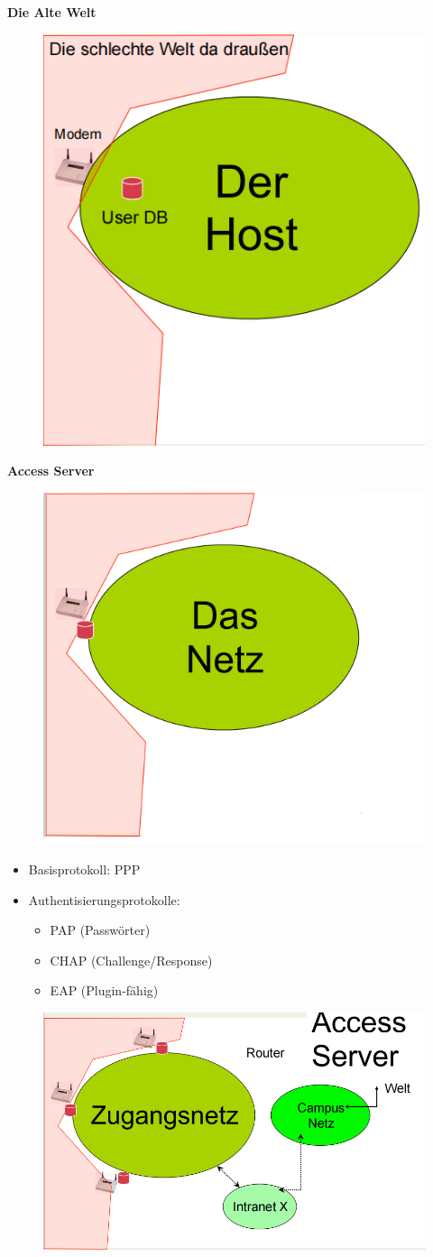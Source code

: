 \documentclass[openany]{book}
\begin{document}
\textbf{Die Alte Welt}

\begin{figure}[h!]
    \centering
    \includegraphics[width=0.45\linewidth]{Pics/OldWorld.PNG}
\end{figure}

\newpage

\textbf{Access Server}

\begin{figure}[h!]
    \centering
    \includegraphics[width=0.45\linewidth]{Pics/AccessServer.PNG}
\end{figure}

\begin{itemize}
    \item Basisprotokoll: PPP
    \item Authentisierungsprotokolle:
    \begin{itemize}
        \item PAP (Passwörter)
        \item CHAP (Challenge/Response)
        \item EAP (Plugin-fähig)
    \end{itemize}
\end{itemize}

\begin{figure}[h!]
    \centering
    \includegraphics[width=0.85\linewidth]{Pics/AccessServer2.PNG}
\end{figure}
\end{document}
